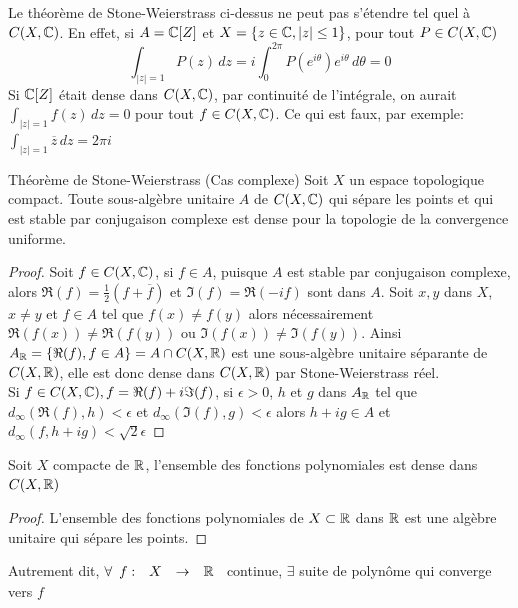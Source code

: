 \documentclass[]{report}
\begin{document}
    \begin{re}{}{}
        Le théorème de Stone-Weierstrass ci-dessus ne peut pas s'étendre tel quel à $C(X,\mathbb{C})$. En effet, si $A=\mathbb{C}[Z]$ et $X=\{z\in \mathbb{C},|z|\le 1\}$, pour tout $P\in C(X,\mathbb{C})$
        \[\int_{|z|=1}P(z)\, dz=i\int_{0}^{2\pi} P(e^{i\theta})e^{i\theta}\, d\theta=0\]
        Si $\mathbb{C}[Z]$ était dense dans $C(X,\mathbb{C})$, par continuité de l'intégrale, on aurait $\int_{|z|=1}f(z)\, dz=0$ pour tout $f\in C(X,\mathbb{C})$. Ce qui est faux, par exemple: $\int_{|z|=1}\overline{z}\, dz=2\pi i$
    \end{re}

    \begin{tm}{Théorème de Stone-Weierstrass (Cas complexe)}{}
        Soit $X$ un espace topologique compact. Toute sous-algèbre unitaire $A$ de $C(X,\mathbb{C})$ qui sépare les points et qui est stable par conjugaison complexe est dense pour la topologie de la convergence uniforme.
    \end{tm}

    \begin{proof}
        Soit $f\in C(X,\mathbb{C})$, si $f\in A$, puisque $A$ est stable par conjugaison complexe, alors $\Re(f)=\frac{1}{2}(f+\overline{f})$ et $\Im(f)=\Re(-if)$ sont dans $A$. Soit $x,y$ dans $X$, $x\neq y$ et $f\in A$ tel que $f(x)\neq f(y)$ alors nécessairement $\Re(f(x))\neq \Re (f(y))$ ou $\Im(f(x))\neq \Im (f(y))$. Ainsi $A_{\mathbb{R}}=\{\Re(f),f\in A\}=A\cap C(X,\mathbb{R})$ est une sous-algèbre unitaire séparante de $C(X,\mathbb{R})$, elle est donc dense dans $C(X,\mathbb{R})$ par Stone-Weierstrass réel.\\
        Si $f\in C(X,\mathbb{C}),f=\Re(f)+ i \Im(f)$, si $\epsilon >0$, $h$ et $g$ dans $A_{\mathbb{R}}$ tel que $d_\infty(\Re(f),h)<\epsilon$ et $d_\infty (\Im(f),g)<\epsilon$ alors $h+ig\in A$ et $d_\infty(f,h+ig)<\sqrt{2}\epsilon$
    \end{proof}

    \begin{cor}{}{}
        Soit $X$ compacte de $\mathbb{R}$, l'ensemble des fonctions polynomiales est dense dans $C(X,\mathbb{R})$
    \end{cor}

    \begin{proof}
        L'ensemble des fonctions polynomiales de $X\subset \mathbb{R}$ dans $\mathbb{R}$ est une algèbre unitaire qui sépare les points.
    \end{proof}

    \begin{re}{}{}
        Autrement dit, $\forall \begin{array}{ccccc} f : & X & \to & \mathbb{R} \end{array}$ continue, $\exists$ suite de polynôme qui converge vers $f$
    \end{re}
\end{document}
